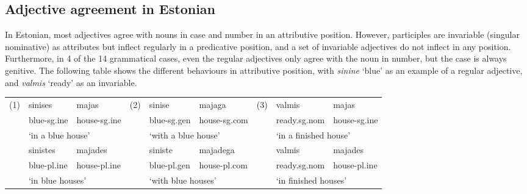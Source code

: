 \documentclass[11pt]{article}
\begin{document}
\subsection{Adjective agreement in Estonian} In Estonian,
most adjectives agree with nouns in case and number in an attributive
position. However, participles are invariable (singular nominative) as 
attributes but inflect regularly in a predicative position, and a set
of invariable adjectives do not inflect in any position. Furthermore,
in 4 of the 14 grammatical cases, even the regular adjectives only
agree with the noun in number, but the case is always genitive.
The following table shows the different behaviours in attributive
position, with \emph{sinine} `blue' as an example of a regular
adjective, and \emph{valmis} `ready' as an invariable.

\begin{table}[h]
\small
\begin{tabular}{cllcllcll}
(1) & sinises & majas & (2) & sinise & majaga & (3) & valmis & majas \\
& blue-{\sc sg.ine} & house-{\sc sg.ine} &  & blue-{\sc sg.gen} & house-{\sc sg.com} &  & ready.{\sc sg.nom} & house-{\sc sg.ine} \\
& \multicolumn{2}{l}{`in a blue house'} &  & \multicolumn{2}{l}{`with a blue house'} &  & \multicolumn{2}{l}{`in a finished house'} \\
& sinistes & majades &  & siniste & majadega &  & valmis & majades \\
& blue-{\sc pl.ine} & house-{\sc pl.ine} &  & blue-{\sc pl.gen} & house-{\sc pl.com} &  & ready.{\sc sg.nom} & house-{\sc pl.ine} \\
& \multicolumn{2}{l}{`in blue houses'} &  & \multicolumn{2}{l}{`with blue
                                         houses'} &  &
                                                     \multicolumn{2}{l}{`in finished houses'}

\end{tabular}
\end{table}

\end{document}
